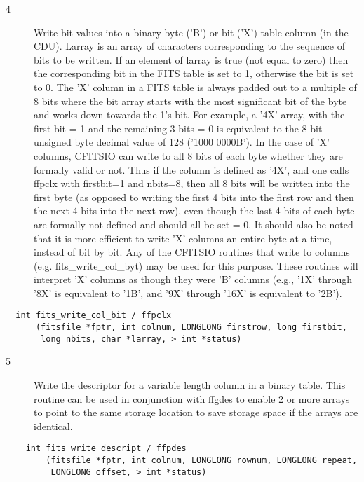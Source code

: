 \documentclass[11pt]{book}
\begin{document}
\begin{description}
\item[4 ] Write bit values into a binary byte ('B') or bit ('X') table column (in
    the CDU).  Larray is an array of characters corresponding to the
    sequence of bits to be written.  If an element of larray is true
    (not equal to zero) then the corresponding bit in the FITS table is
    set to 1, otherwise the bit is set to 0.  The 'X' column in a FITS
    table is always padded out to a multiple of 8 bits where the bit
    array starts with the most significant bit of the byte and works
    down towards the 1's bit.  For example, a '4X' array, with the
    first bit = 1 and the remaining 3 bits = 0 is equivalent to the 8-bit
    unsigned byte decimal value of 128  ('1000 0000B').  In the case of
    'X' columns, CFITSIO can write to all 8 bits of each byte whether
    they are formally valid or not.  Thus if the column is defined as
    '4X', and one calls ffpclx with firstbit=1 and nbits=8, then all
    8 bits will be written into the first byte (as opposed to writing
    the first 4 bits into the first row and then the next 4 bits into
    the next row), even though the last 4 bits of each byte are formally
    not defined and should all be set = 0.  It should also be noted that
    it is more efficient to write 'X' columns an entire byte at a time,
    instead of bit by bit.  Any of the CFITSIO routines that write to
    columns (e.g. fits\_write\_col\_byt) may be used for this purpose.
    These routines will interpret 'X' columns as though they were 'B'
    columns (e.g.,  '1X' through '8X' is equivalent
   to '1B', and '9X' through '16X' is equivalent to '2B').  \label{ffpclx}
\end{description}

\begin{verbatim}
  int fits_write_col_bit / ffpclx
      (fitsfile *fptr, int colnum, LONGLONG firstrow, long firstbit,
       long nbits, char *larray, > int *status)
\end{verbatim}

\begin{description}
\item[5 ] Write the descriptor for a variable length column in a binary table.
    This routine can be used in conjunction with ffgdes to enable
    2 or more arrays to point to the same storage location to save
   storage space if the arrays are identical. \label{ffpdes}
\end{description}

\begin{verbatim}
    int fits_write_descript / ffpdes
        (fitsfile *fptr, int colnum, LONGLONG rownum, LONGLONG repeat,
         LONGLONG offset, > int *status)
\end{verbatim}
\end{document}
